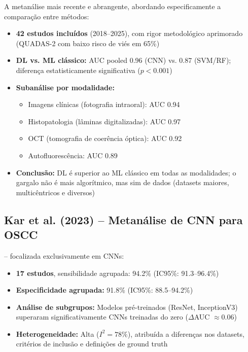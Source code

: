 A metanálise mais recente e abrangente, abordando especificamente a comparação
entre métodos:
\begin{itemize}
  \item \textbf{42 estudos incluídos} (2018--2025), com rigor metodológico
        aprimorado (QUADAS-2 com baixo risco de viés em 65\%)
  \item \textbf{DL vs. ML clássico:} AUC pooled 0.96 (CNN) vs. 0.87 (SVM/RF);
        diferença estatisticamente significativa ($p < 0.001$)
  \item \textbf{Subanálise por modalidade:}
        \begin{itemize}
          \item Imagens clínicas (fotografia intraoral): AUC 0.94
          \item Histopatologia (lâminas digitalizadas): AUC 0.97
          \item OCT (tomografia de coerência óptica): AUC 0.92
          \item Autofluorescência: AUC 0.89
        \end{itemize}
  \item \textbf{Conclusão:} DL é superior ao ML clássico em todas as modalidades;
        o gargalo não é mais algorítmico, mas sim de dados (datasets maiores,
        multicêntricos e diversos)
\end{itemize}

\subsection{Kar et al. (2023) -- Metanálise de CNN para OSCC}

 -- focalizada exclusivamente em CNNs:
\begin{itemize}
  \item \textbf{17 estudos}, sensibilidade agrupada: 94.2\% (IC95\%: 91.3--96.4\%)
  \item \textbf{Especificidade agrupada:} 91.8\% (IC95\%: 88.5--94.2\%)
  \item \textbf{Análise de subgrupos:} Modelos pré-treinados (ResNet, InceptionV3)
        superaram significativamente CNNs treinadas do zero ($\Delta$AUC $\approx 0.06$)
  \item \textbf{Heterogeneidade:} Alta ($I^2 = 78\%$), atribuída a diferenças nos
        datasets, critérios de inclusão e definições de ground truth
\end{itemize}


